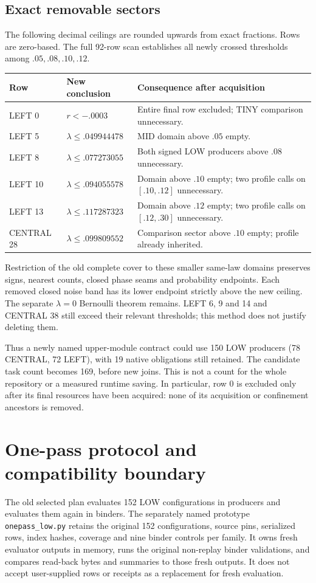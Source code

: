 \documentclass[11pt]{article}
\begin{document}
\subsection{Exact removable sectors}
The following decimal ceilings are rounded upwards from exact fractions.
Rows are zero-based. The full 92-row scan establishes all newly crossed
thresholds among $.05,.08,.10,.12$.
\begin{center}
\begin{tabular}{@{}llp{69mm}@{}}
\toprule
Row & New conclusion & Consequence after acquisition\\
\midrule
LEFT 0 & $r<-.0003$ & Entire final row excluded; TINY comparison unnecessary.\\
LEFT 5 & $\lambda\le.049944478$ & MID domain above $.05$ empty.\\
LEFT 8 & $\lambda\le.077273055$ & Both signed LOW producers above $.08$ unnecessary.\\
LEFT 10 & $\lambda\le.094055578$ & Domain above $.10$ empty; two profile calls on $[.10,.12]$ unnecessary.\\
LEFT 13 & $\lambda\le.117287323$ & Domain above $.12$ empty; two profile calls on $[.12,.30]$ unnecessary.\\
CENTRAL 28 & $\lambda\le.099809552$ & Comparison sector above $.10$ empty; profile already inherited.\\
\bottomrule
\end{tabular}
\end{center}
Restriction of the old complete cover to these smaller same-law domains
preserves signs, nearest counts, closed phase seams and probability
endpoints. Each removed closed noise band has its lower endpoint strictly
above the new ceiling. The separate $\lambda=0$ Bernoulli theorem remains.
LEFT 6, 9 and 14 and CENTRAL 38 still exceed their relevant thresholds;
this method does not justify deleting them.

Thus a newly named upper-module contract could use 150 LOW producers
(78 CENTRAL, 72 LEFT), with 19 native obligations still retained. The
candidate task count becomes 169, before new joins. This is not a count
for the whole repository or a measured runtime saving. In particular,
row 0 is excluded only after its final resources have been acquired:
none of its acquisition or confinement ancestors is removed.

\section{One-pass protocol and compatibility boundary}
The old selected plan evaluates 152 LOW configurations in producers and
evaluates them again in binders. The separately named prototype
\texttt{onepass\_low.py} retains the original 152 configurations, source
pins, serialized rows, index hashes, coverage and nine binder controls per
family. It owns fresh evaluator outputs in memory, runs the original
non-replay binder validations, and compares read-back bytes and summaries
to those fresh outputs. It does not accept user-supplied rows or receipts
as a replacement for fresh evaluation.
\end{document}
